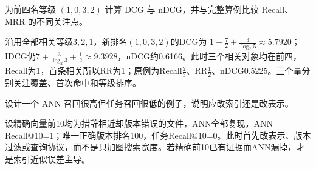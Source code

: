 \begin{exercises}
\begin{exercise} 为前四名等级 $(1,0,3,2)$ 计算 DCG 与 nDCG，并与完整算例比较 Recall、MRR 的不同关注点。

\begin{solution}
沿用全部相关等级$3,2,1$，新排名$(1,0,3,2)$的DCG为 $1+\frac{7}{2}+\frac{3}{\log_2 5}\approx5.7920$；IDCG仍$7+\frac{3}{\log_2 3}+\frac{1}{2}\approx9.3928$，nDCG约0.6166。此时三个相关对象均在前四，Recall为1，首条相关所以RR为1；原例为Recall$\frac{2}{3}$、RR$\frac{1}{2}$、nDCG0.5225。三个量分别关注覆盖、首次命中和等级排序。
\end{solution}
\end{exercise}

\begin{exercise} 设计一个 ANN 召回很高但任务召回很低的例子，说明应改索引还是改表示。

\begin{solution}
设精确向量前10均为措辞相近却版本错误的文件，ANN全部复现，ANN Recall@10=1；唯一正确版本排名100，任务Recall@10=0。此时首先改表示、版本过滤或查询协议，而不是只加图搜索宽度。若精确前10已有证据而ANN漏掉，才是索引近似误差主导。
\end{solution}
\end{exercise}

\end{exercises}
